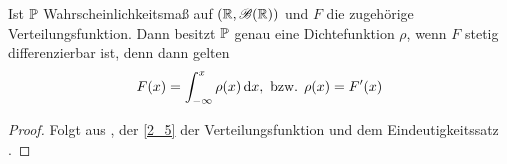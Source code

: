 \begin{conclusion}
	Ist $\mathbb{P}$ Wahrscheinlichkeitsmaß auf $(\mathbb{R}, \mathscr{B}(\mathbb{R}))$ und $F$ die zugehörige Verteilungsfunktion. Dann besitzt $\mathbb{P}$ genau eine Dichtefunktion $\rho$, wenn $F$ stetig differenzierbar ist, denn dann gelten
	\begin{align}
		F(x) = \int_{-\infty}^{x} \rho(x) \,\mathrm{d} x, \text{ bzw. } \rho(x) = F'(x)\notag
	\end{align}
\end{conclusion}

\begin{proof}
	Folgt aus , der \cref{2_5} der Verteilungsfunktion und dem Eindeutigkeitssatz .
\end{proof}